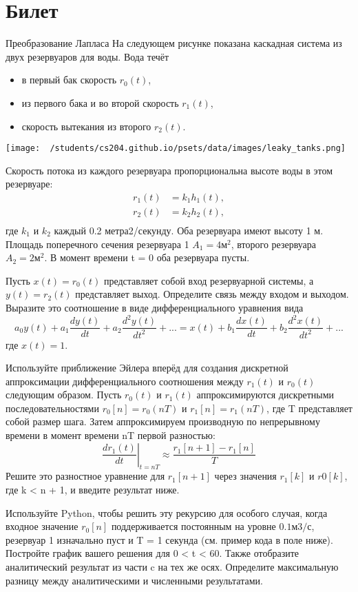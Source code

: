 \documentclass{exam}
\begin{document}
\newpage
\section{Билет}
\begin{questions}
	\question 
Преобразование Лапласа 
	\question 
На следующем рисунке показана каскадная система 
из двух резервуаров для воды. Вода течёт
	\begin{itemize}
		\item в первый бак скорость \(r_0(t)\),
		\item из первого бака и во второй скорость \(r_1(t)\),
		\item скорость вытекания из второго \(r_2(t)\).
	\end{itemize}

	\texttt{[image: ~/students/cs204.github.io/psets/data/images/leaky\_tanks.png]}

Скорость потока из каждого резервуара пропорциональна 
высоте воды в этом резервуаре:
	\[
\begin{split}
r_1(t)&=k_1h_1(t),\\
r_2(t)&=k_2h_2(t),\\
\end{split}
\]
где \(k_1\) и \(k_2\) каждый 0.2 метра2/секунду.
Оба резервуара имеют высоту 1 м. 
Площадь поперечного сечения резервуара 1 \(A_1 = 4 м^2\), 
второго резервуара \(A_2 = 2 м^2\).
В момент времени t = 0 оба резервуара пусты.

Пусть \(x(t) = r_0 (t)\) представляет собой вход 
резервуарной системы, а \(y(t) = r_2 (t)\) представляет выход.
Определите связь между входом и выходом.
Выразите это соотношение в виде дифференциального уравнения вида
	\[
a_0y(t)+a_1\frac{dy(t)}{dt}+a_2\frac{d^2y(t)}{dt^2}+...=x(t)+b_1\frac{dx(t)}{dt}+b_2\frac{d^2x(t)}{dt^2}+...
\]
где \(x(t)=1\).



Используйте приближение Эйлера вперёд для создания 
дискретной аппроксимации дифференциального соотношения 
между \(r_1 (t)\) и \(r_0 (t)\) следующим образом.
Пусть \(r_0(t)\) и \(r_1 (t)\) аппроксимируются 
дискретными последовательностями \(r_0 [n] = r_0 (nT)\) 
и \(r_1 [n] = r_1 (nT)\), где T представляет собой размер шага.
Затем аппроксимируем производную по непрерывному времени 
в момент времени nT первой разностью:
	\[
\left. \frac{dr_1(t)}{dt}\right\vert_{t=nT}\approx \frac{r_1[n+1]-r_1[n]}{T}
\]
Решите это разностное уравнение для \(r_1 [n + 1]\) через 
значения \(r_1 [k]\) и \(r0 [k]\), где k < n + 1, 
и введите результат ниже.


Используйте Python, чтобы решить эту рекурсию для особого случая, 
когда входное значение \(r_0 [n]\) поддерживается постоянным 
на уровне \(0.1 м3/с\), резервуар 1 изначально пуст и
T = 1 секунда (см. пример кода в поле ниже).
Постройте график вашего решения для 0 < t < 60.
Также отобразите аналитический результат из части c на тех же осях.
Определите максимальную разницу между аналитическими и численными результатами.

\end{questions}
\vspace{15pt}
\end{document}
